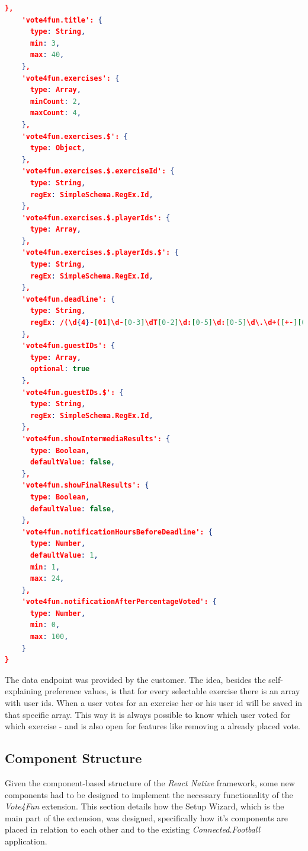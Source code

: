 \begin{lstlisting}[language=json,caption=\textit{Vote4Fun} JSON Object,label=lst:vote4fun_json]
    },
    'vote4fun.title': {
      type: String,
      min: 3,
      max: 40,
    },
    'vote4fun.exercises': {
      type: Array,
      minCount: 2,
      maxCount: 4,
    },
    'vote4fun.exercises.$': {
      type: Object,
    },
    'vote4fun.exercises.$.exerciseId': {
      type: String,
      regEx: SimpleSchema.RegEx.Id,
    },
    'vote4fun.exercises.$.playerIds': {
      type: Array,
    },
    'vote4fun.exercises.$.playerIds.$': {
      type: String,
      regEx: SimpleSchema.RegEx.Id,
    },
    'vote4fun.deadline': {
      type: String,
      regEx: /(\d{4}-[01]\d-[0-3]\dT[0-2]\d:[0-5]\d:[0-5]\d\.\d+([+-][0-2]\d:[0-5]\d|Z))|(\d{4}-[01]\d-[0-3]\dT[0-2]\d:[0-5]\d:[0-5]\d([+-][0-2]\d:[0-5]\d|Z))|(\d{4}-[01]\d-[0-3]\dT[0-2]\d:[0-5]\d([+-][0-2]\d:[0-5]\d|Z))/,
    },
    'vote4fun.guestIDs': {
      type: Array,
      optional: true
    },
    'vote4fun.guestIDs.$': {
      type: String,
      regEx: SimpleSchema.RegEx.Id,
    },
    'vote4fun.showIntermediaResults': {
      type: Boolean,
      defaultValue: false,
    },
    'vote4fun.showFinalResults': {
      type: Boolean,
      defaultValue: false,
    },
    'vote4fun.notificationHoursBeforeDeadline': {
      type: Number,
      defaultValue: 1,
      min: 1,
      max: 24,
    },
    'vote4fun.notificationAfterPercentageVoted': {
      type: Number,
      min: 0,
      max: 100,
    }
}
\end{lstlisting}

The data endpoint was provided by the customer. The idea, besides the self-explaining preference values, is that for every selectable exercise there is an array with user ids. When a user votes for an exercise her or his user id will be saved in that specific array. This way it is always possible to know which user voted for which exercise - and is also open for features like removing a already placed vote.

\subsection{Component Structure}
\label{ssec:component_structure}

Given the component-based structure of the \textit{React Native} framework, some new components had to be designed to implement the necessary functionality of the \textit{Vote4Fun} extension. This section details how the Setup Wizard, which is the main part of the extension, was designed, specifically how it's components are placed in relation to each other and to the existing \textit{Connected.Football} application.

